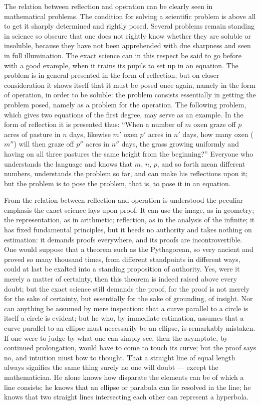 \documentclass[12pt]{book}
\begin{document}
The relation between reflection and operation can be clearly seen in mathematical
problems. The condition for solving a scientific problem is above all to get it
sharply determined and rightly posed. Several problems remain standing in science so
obscure that one does not rightly know whether they are soluble or insoluble,
because they have not been apprehended with due sharpness and seen in full
illumination. The exact science can in this respect be said to go before with a good
example, when it trains its pupils to set up in an equation. The problem is in
general presented in the form of reflection; but on closer consideration it shows
itself that it must be posed once again, namely in the form of operation, in order
to be soluble: the problem consists essentially in getting the problem posed, namely
as a problem for the operation. The following problem, which gives two equations of
the first degree, may serve as an example. In the form of reflection it is presented
thus: ``When a number of $m$ oxen graze off $p$ acres of pasture in $n$ days,
likewise $m'$ oxen $p'$ acres in $n'$ days, how many oxen ($m''$) will then graze off
$p''$ acres in $n''$ days, the grass growing uniformly and having on all three
pastures the same height from the beginning?'' Everyone who understands the language
and knows that $m$, $n$, $p$, and so forth mean different numbers, understands the
problem so far, and can make his reflections upon it; but the problem is to pose the
problem, that is, to pose it in an equation.

From the relation between reflection and operation is understood the peculiar
emphasis the exact science lays upon proof. It can use the image, as in geometry; the
representation, as in arithmetic; reflection, as in the analysis of the infinite; it
has fixed fundamental principles, but it heeds no authority and takes nothing on
estimation: it demands proofs everywhere, and its proofs are incontrovertible. One
would suppose that a theorem such as the Pythagorean, so very ancient and proved so
many thousand times, from different standpoints in different ways, could at last be
exalted into a standing proposition of authority. Yes, were it merely a matter of
certainty, then this theorem is indeed raised above every doubt; but the exact
science still demands the proof, for the proof is not merely for the sake of
certainty, but essentially for the sake of grounding, of insight. Nor can anything be
assumed by mere inspection: that a curve parallel to a circle is itself a circle is
evident; but he who, by immediate estimation, assumes that a curve parallel to an
ellipse must necessarily be an ellipse, is remarkably mistaken. If one were to judge
by what one can simply see, then the asymptote, by continued prolongation, would have
to come to touch its curve; but the proof says no, and intuition must bow to thought.
That a straight line of equal length always signifies the same thing surely no one
will doubt --- except the mathematician. He alone knows how disparate the elements can
be of which a line consists; he knows that an ellipse or parabola can lie resolved in
the line; he knows that two straight lines intersecting each other can represent a
hyperbola.
\end{document}
